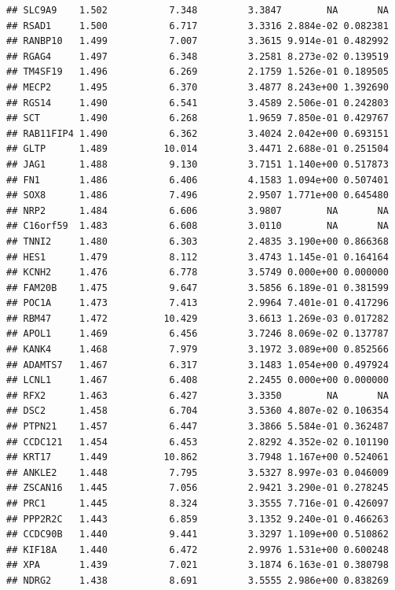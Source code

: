 \documentclass{article}\usepackage[]{graphicx}\usepackage[]{color}
\makeatletter
\newenvironment{kframe}{%
 \def\at@end@of@kframe{}%
 \ifinner\ifhmode%
  \def\at@end@of@kframe{\end{minipage}}%
  \begin{minipage}{\columnwidth}%
 \fi\fi%
 \def\FrameCommand##1{\hskip\@totalleftmargin \hskip-\fboxsep
 \colorbox{shadecolor}{##1}\hskip-\fboxsep
     \hskip-\linewidth \hskip-\@totalleftmargin \hskip\columnwidth}%
 \MakeFramed {\advance\hsize-\width
   \@totalleftmargin\z@ \linewidth\hsize
   \@setminipage}}%
 {\par\unskip\endMakeFramed%
 \at@end@of@kframe}
\newenvironment{knitrout}{}{} %
\makeatother
\begin{document}
\begin{knitrout}
\begin{kframe}
\begin{verbatim}
## SLC9A9    1.502           7.348         3.3847        NA       NA
## RSAD1     1.500           6.717         3.3316 2.884e-02 0.082381
## RANBP10   1.499           7.007         3.3615 9.914e-01 0.482992
## RGAG4     1.497           6.348         3.2581 8.273e-02 0.139519
## TM4SF19   1.496           6.269         2.1759 1.526e-01 0.189505
## MECP2     1.495           6.370         3.4877 8.243e+00 1.392690
## RGS14     1.490           6.541         3.4589 2.506e-01 0.242803
## SCT       1.490           6.268         1.9659 7.850e-01 0.429767
## RAB11FIP4 1.490           6.362         3.4024 2.042e+00 0.693151
## GLTP      1.489          10.014         3.4471 2.688e-01 0.251504
## JAG1      1.488           9.130         3.7151 1.140e+00 0.517873
## FN1       1.486           6.406         4.1583 1.094e+00 0.507401
## SOX8      1.486           7.496         2.9507 1.771e+00 0.645480
## NRP2      1.484           6.606         3.9807        NA       NA
## C16orf59  1.483           6.608         3.0110        NA       NA
## TNNI2     1.480           6.303         2.4835 3.190e+00 0.866368
## HES1      1.479           8.112         3.4743 1.145e-01 0.164164
## KCNH2     1.476           6.778         3.5749 0.000e+00 0.000000
## FAM20B    1.475           9.647         3.5856 6.189e-01 0.381599
## POC1A     1.473           7.413         2.9964 7.401e-01 0.417296
## RBM47     1.472          10.429         3.6613 1.269e-03 0.017282
## APOL1     1.469           6.456         3.7246 8.069e-02 0.137787
## KANK4     1.468           7.979         3.1972 3.089e+00 0.852566
## ADAMTS7   1.467           6.317         3.1483 1.054e+00 0.497924
## LCNL1     1.467           6.408         2.2455 0.000e+00 0.000000
## RFX2      1.463           6.427         3.3350        NA       NA
## DSC2      1.458           6.704         3.5360 4.807e-02 0.106354
## PTPN21    1.457           6.447         3.3866 5.584e-01 0.362487
## CCDC121   1.454           6.453         2.8292 4.352e-02 0.101190
## KRT17     1.449          10.862         3.7948 1.167e+00 0.524061
## ANKLE2    1.448           7.795         3.5327 8.997e-03 0.046009
## ZSCAN16   1.445           7.056         2.9421 3.290e-01 0.278245
## PRC1      1.445           8.324         3.3555 7.716e-01 0.426097
## PPP2R2C   1.443           6.859         3.1352 9.240e-01 0.466263
## CCDC90B   1.440           9.441         3.3297 1.109e+00 0.510862
## KIF18A    1.440           6.472         2.9976 1.531e+00 0.600248
## XPA       1.439           7.021         3.1874 6.163e-01 0.380798
## NDRG2     1.438           8.691         3.5555 2.986e+00 0.838269

\end{verbatim}
\end{kframe}
\end{knitrout}
\end{document}
